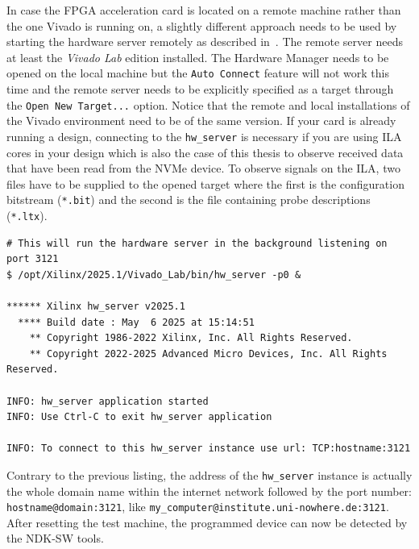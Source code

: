 In case the FPGA acceleration card is located on a remote machine rather than the one Vivado is running
on, a slightly different approach needs to be used by starting the hardware server remotely as
described in~\cite{vivado_remote_hw_server}. The remote server needs at least the \emph{Vivado Lab}
edition installed. The Hardware Manager needs to be opened on the local machine but the
\verb|Auto Connect| feature will not work this time and the remote server needs to be explicitly
specified as a target through the \verb|Open New Target...| option. Notice that the remote and local
installations of the Vivado environment need to be of the same version. If your card is already
running a design, connecting to the \verb|hw_server| is necessary if you are using \ac{ILA} cores in
your design which is also the case of this thesis to observe received data that have been read from
the NVMe device. To observe signals on the ILA, two files have to be supplied to the opened target
where the first is the configuration bitstream (\verb|*.bit|) and the second is the file containing
probe descriptions (\verb|*.ltx|).

\begin{lstlisting}[caption={Running hardware server on the remote machine}]
# This will run the hardware server in the background listening on port 3121
$ /opt/Xilinx/2025.1/Vivado_Lab/bin/hw_server -p0 &

****** Xilinx hw_server v2025.1
  **** Build date : May  6 2025 at 15:14:51
    ** Copyright 1986-2022 Xilinx, Inc. All Rights Reserved.
    ** Copyright 2022-2025 Advanced Micro Devices, Inc. All Rights Reserved.

INFO: hw_server application started
INFO: Use Ctrl-C to exit hw_server application

INFO: To connect to this hw_server instance use url: TCP:hostname:3121
\end{lstlisting}

Contrary to the previous listing, the address of the \verb|hw_server| instance is actually the whole
domain name within the internet network followed by the port number: \verb|hostname@domain:3121|,
like \verb|my_computer@institute.uni-nowhere.de:3121|. After resetting the test machine, the
programmed device can now be detected by the NDK-SW tools.

